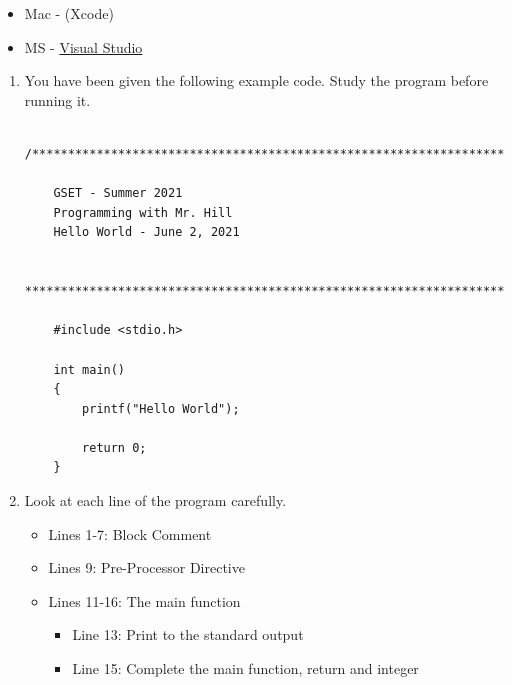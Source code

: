 \documentclass[12pt]{article}
\begin{document}
\begin{description}[labelindent=1cm]
\begin{itemize}
	\item Mac - (Xcode)  
    
    \item MS - \href{https://visualstudio.microsoft.com/}{Visual Studio}
    
\end{itemize}	
\newpage

\item[\textbf{\underline{Part 2 - The C++ Code:}}] \hfill \vspace{0mm}
\begin{enumerate}
    \item You have been given the following example code. Study the program before running it.
	\begin{lstlisting}
	/********************************************************************
	
	GSET - Summer 2021 
	Programming with Mr. Hill 
	Hello World - June 2, 2021
	
	*********************************************************************/
	
	#include <stdio.h>
	
	int main()
	{
		printf("Hello World");
	
		return 0;
	}

	\end{lstlisting}

	\item	
Look at each line of the program carefully.
	\begin{itemize}
		\item Lines 1-7: Block Comment 
		\item Lines 9: Pre-Processor Directive
		\item Lines 11-16: The main function
		 \begin{itemize}
		 	\item Line 13: Print to the standard output
		 	\item Line 15: Complete the main function, return and integer 
	 	 \end{itemize}
	\end{itemize}
	
\end{enumerate}

	\item[\textbf{\underline{Part 3 - Testing:}}] \hfill \vspace{0mm}
	\begin{enumerate}
	

\end{enumerate}
\end{description}
\end{document}

